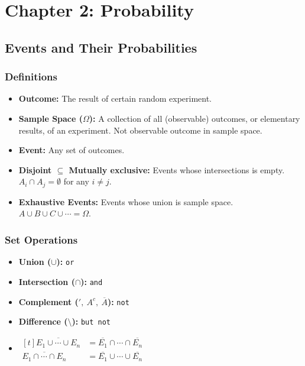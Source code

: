 \section{Chapter 2: Probability}

\begin{multicols}{2}
\setlength{\columnsep}{1.5cm}
\setlength{\columnseprule}{0.2pt}

\subsection{Events and Their Probabilities}

\subsubsection*{Definitions}

\begin{itemize}
    \item \textbf{Outcome:} The result of certain random experiment.
    \item \textbf{Sample Space ($\Omega$):} A collection of all (observable) outcomes, or elementary results, of an experiment. Not observable outcome in sample space.
    \item \textbf{Event:} Any set of outcomes.
    \item \textbf{Disjoint $\subseteq$ Mutually exclusive:} Events whose intersections is empty. $A_i \cap A_j = \emptyset$ for any $i \neq j$.
    \item \textbf{Exhaustive Events:} Events whose union is sample space. $A \cup B \cup C \cup \cdots = \Omega$.
\end{itemize}


\subsubsection*{Set Operations}

\begin{itemize}
    \item \textbf{Union ($\cup$):} \texttt{or}
    \item \textbf{Intersection ($\cap$):} \texttt{and}
    \item \textbf{Complement ($',\ A^c,\ \overline{A}$):} \texttt{not}
    \item \textbf{Difference ($\setminus$):} \texttt{but not}
    \item 
        $ \begin{aligned}[t]
            \overline{E_1 \cup \cdots \cup E_n} &= \overline{E_1} \cap \cdots \cap \overline{E_n}\\
            \overline{E_1 \cap \cdots \cap E_n} &= \overline{E_1} \cup \cdots \cup \overline{E_n}
        \end{aligned} $
\end{itemize}



\end{multicols}

